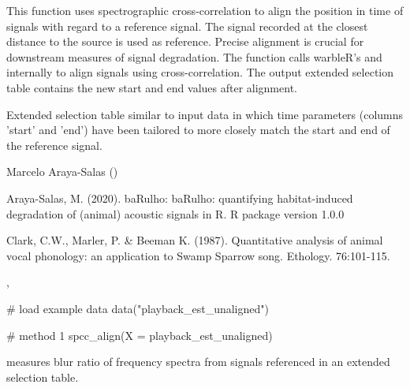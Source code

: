 \documentclass[letterpaper]{book}
\begin{document}
%
\begin{Details}\relax
This function uses spectrographic cross-correlation to align the position in time of signals with regard to a reference signal. The signal recorded at the closest distance to the source is used as reference. Precise alignment is crucial for downstream measures of signal degradation. The function calls warbleR's  and  internally to align signals using cross-correlation. The output extended selection table contains the new start and end values after alignment.
\end{Details}
%
\begin{Value}
Extended selection table similar to input data in which time parameters (columns 'start' and 'end') have been tailored to more closely match the start and end of the reference signal.
\end{Value}
%
\begin{Author}\relax
Marcelo Araya-Salas ()
\end{Author}
%
\begin{References}\relax

Araya-Salas, M. (2020). baRulho: baRulho: quantifying habitat-induced degradation of (animal) acoustic signals in R. R package version 1.0.0

Clark, C.W., Marler, P. \& Beeman K. (1987). Quantitative analysis of animal vocal phonology: an application to Swamp Sparrow song. Ethology. 76:101-115. 

\end{References}
%
\begin{SeeAlso}\relax
{}, 
\end{SeeAlso}
%
\begin{Examples}
\begin{ExampleCode}
{
# load example data
data("playback_est_unaligned")

# method 1
spcc_align(X = playback_est_unaligned)
}

\end{ExampleCode}
\end{Examples}
%
\begin{Description}\relax
{} measures blur ratio of frequency spectra from signals referenced in an extended selection table.
\end{Description}
\end{document}
